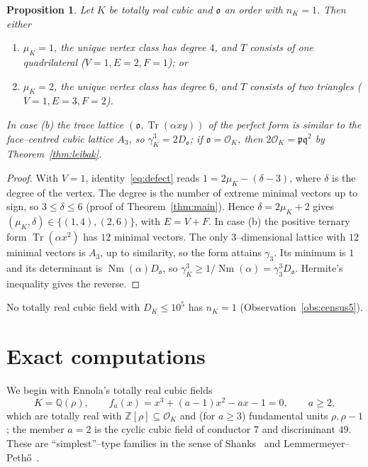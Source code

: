 \documentclass[11pt,reqno]{amsart}
\theoremstyle{plain}
\newtheorem{proposition}[theorem]{Proposition}
\theoremstyle{definition}
\newcommand{\Z}{\mathbb{Z}}
\newcommand{\Q}{\mathbb{Q}}
\newcommand{\Nm}{\operatorname{Nm}}
\newcommand{\Tr}{\operatorname{Tr}}
\newcommand{\Ok}{\mathfrak{o}}
\newcommand{\nK}{n_K}
\newcommand{\muK}{\mu_K}
\begin{document}
\begin{proposition}\label{prop:none}
Let $K$ be totally real cubic and $\Ok$ an order with $\nK=1$. Then either
\begin{enumerate}[label=\textup{(\alph*)},leftmargin=2.2em]
\item $\muK=1$, the unique vertex class has degree $4$, and $T$ consists of one quadrilateral
\textup{(}$V=1,E=2,F=1$\textup{)}; or
\item $\muK=2$, the unique vertex class has degree $6$, and $T$ consists of two triangles \textup{(}$V=1,E=3,F=2$\textup{)}.
\end{enumerate}
In case \textup{(b)} the trace lattice $(\Ok,\Tr(\alpha xy))$ of the perfect form is similar to the
face--centred cubic lattice $A_3$, so $\gamma_K^3=2D_\Ok$; if $\Ok=\mathcal O_K$, then
$2\mathcal O_K=\mathfrak p\mathfrak q^2$ by Theorem~\ref{thm:leibak}.
\end{proposition}

\begin{proof}
With $V=1$, identity~\eqref{eq:defect} reads $1=2\muK-(\delta-3)$, where $\delta$ is the degree of the
vertex. The degree is the number of extreme minimal vectors up to sign, so $3\le\delta\le6$ (proof of
Theorem~\ref{thm:main}). Hence $\delta=2\muK+2$ gives $(\muK,\delta)\in\{(1,4),(2,6)\}$, with $E=V+F$. In
case (b) the positive ternary form $\Tr(\alpha x^2)$ has $12$ minimal vectors. The only $3$--dimensional
lattice with $12$ minimal vectors is $A_3$, up to similarity, so the form attains $\gamma_3$. Its minimum
is $1$ and its determinant is $\Nm(\alpha)D_\Ok$, so $\gamma_K^3\ge1/\Nm(\alpha)=\gamma_3^3D_\Ok$. Hermite's
inequality gives the reverse.
\end{proof}

No totally real cubic field with $D_K\le10^5$ has $\nK=1$ (Observation~\ref{obs:census5}).

\section{Exact computations}\label{sec:comp}

We begin with Ennola's totally real cubic fields~\cite{Ennola}
\[
K=\Q(\rho),\qquad f_a(x)=x^3+(a-1)x^2-ax-1=0,\qquad a\ge2,
\]
which are totally real with $\Z[\rho]\subseteq\mathcal O_K$ and (for $a\ge3$) fundamental units
$\rho,\rho-1$; the member $a=2$ is the cyclic cubic field of conductor $7$ and discriminant $49$. These are
``simplest''--type families in the sense of Shanks~\cite{Shanks} and Lemmermeyer--Peth\H o~\cite{LP}.
\end{document}
